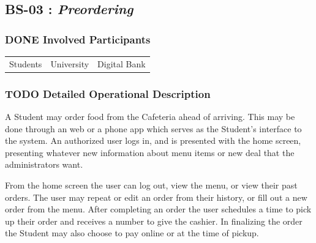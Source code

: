 \documentclass[11pt]{article}
\begin{document}
\subsection{\label{org162af8c}BS-03 : \emph{Preordering}}
\label{sec:org2e866f9}
\subsubsection{{\bfseries\sffamily DONE} Involved Participants}
\label{sec:org17a7d03}
\begin{center}
\begin{tabular}{lll}
Students & University & Digital Bank\\
\end{tabular}
\end{center}
\subsubsection{{\bfseries\sffamily TODO} Detailed Operational Description}
\label{sec:orgff92b4b}
A Student may order food from the Cafeteria ahead of
arriving. This may be done through an web or a phone app which
serves as the Student's interface to the system. An authorized
user logs in, and is presented with the home screen, presenting
whatever new information about menu items or new deal that the
administrators want.

From the home screen the user can log out, view the menu, or view
their past orders. The user may repeat or edit an order from
their history, or fill out a new order from the menu. After
completing an order the user schedules a time to pick up their
order and receives a number to give the cashier. In finalizing the
order the Student may also choose to pay online or at the time of
pickup.
\end{document}
